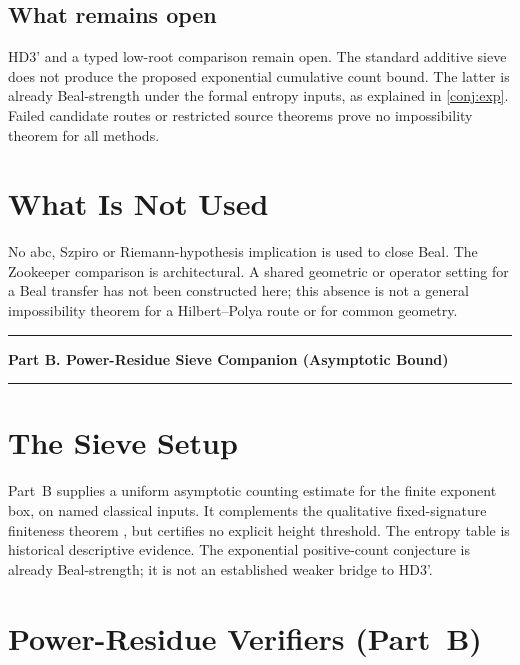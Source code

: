 \documentclass[11pt,a4paper]{article}
\begin{document}
\subsection*{What remains open}
HD3' and a typed low-root comparison remain open. The standard additive
sieve does not produce the proposed exponential cumulative count bound.
The latter is already Beal-strength under the formal entropy inputs,
as explained in \cref{conj:exp}. Failed candidate routes or restricted
source theorems prove no impossibility theorem for all methods.

\section{What Is Not Used}

No abc, Szpiro or Riemann-hypothesis implication is used to close Beal.
The Zookeeper comparison is architectural. A shared geometric or
operator setting for a Beal transfer has not been constructed here;
this absence is not a general impossibility theorem for a
Hilbert--Polya route or for common geometry.

\bigskip\hrule\medskip
\begin{center}
\textbf{Part B. Power-Residue Sieve Companion (Asymptotic Bound)}
\end{center}
\medskip\hrule\bigskip

\section{The Sieve Setup}
\label{sec:weilinput}

Part~B supplies a uniform asymptotic counting estimate for the finite
exponent box, on named classical inputs. It complements the
qualitative fixed-signature finiteness theorem
\cite{DarmonGranville1995}, but certifies no explicit height threshold.
The entropy table is historical descriptive evidence.
The exponential positive-count conjecture is already Beal-strength;
it is not an established weaker bridge to HD3'.

\section{Power-Residue Verifiers (Part~B)}

\end{document}
